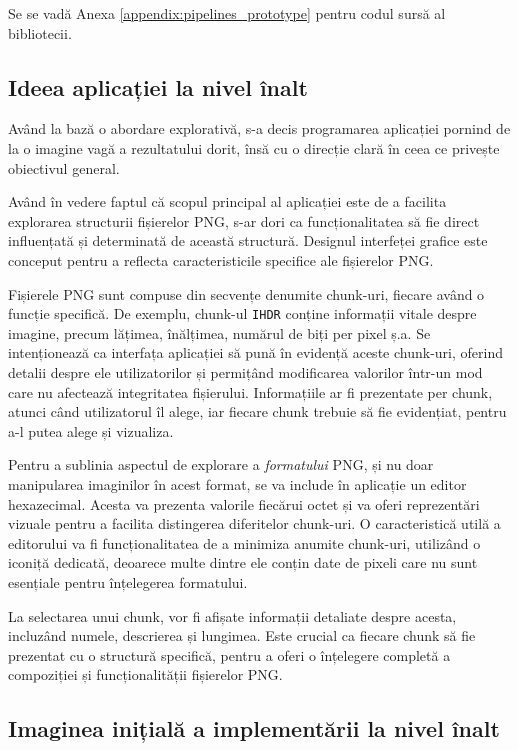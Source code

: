 \documentclass[a4paper,12pt]{report}
\begin{document}
Se se vadă Anexa \ref{appendix:pipelines_prototype} pentru codul sursă al bibliotecii.

\subsection{Ideea aplicației la nivel înalt}

Având la bază o abordare explorativă, s-a decis programarea aplicației
pornind de la o imagine vagă a rezultatului dorit,
însă cu o direcție clară în ceea ce privește obiectivul general.

Având în vedere faptul că scopul principal al aplicației
este de a facilita explorarea structurii fișierelor \ac{PNG},
s-ar dori ca funcționalitatea să fie direct
influențată și determinată de această structură.
Designul interfeței grafice este conceput pentru a reflecta
caracteristicile specifice ale fișierelor \ac{PNG}.

Fișierele \ac{PNG} sunt compuse din secvențe denumite chunk-uri,
fiecare având o funcție specifică.
De exemplu, chunk-ul \texttt{IHDR} conține informații vitale despre imagine,
precum lățimea, înălțimea, numărul de biți per pixel ș.a.
Se intenționează ca interfața aplicației să pună
în evidență aceste chunk-uri, oferind detalii despre ele utilizatorilor
și permițând modificarea valorilor într-un mod
care nu afectează integritatea fișierului.
Informațiile ar fi prezentate per chunk, atunci când utilizatorul îl alege,
iar fiecare chunk trebuie să fie evidențiat, pentru a-l putea alege și vizualiza.

Pentru a sublinia aspectul de explorare a \textit{formatului} \ac{PNG},
și nu doar manipularea imaginilor în acest format,
se va include în aplicație un editor hexazecimal.
Acesta va prezenta valorile fiecărui octet și
va oferi reprezentări vizuale pentru a facilita distingerea diferitelor chunk-uri.
O caracteristică utilă a editorului va fi funcționalitatea
de a minimiza anumite chunk-uri, utilizând o iconiță dedicată,
deoarece multe dintre ele conțin date de pixeli
care nu sunt esențiale pentru înțelegerea formatului.

La selectarea unui chunk, vor fi afișate informații detaliate despre acesta,
incluzând numele, descrierea și lungimea.
Este crucial ca fiecare chunk să fie prezentat cu o structură specifică,
pentru a oferi o înțelegere completă a compoziției și funcționalității fișierelor \ac{PNG}.


\subsection{Imaginea inițială a implementării la nivel înalt}
\end{document}
